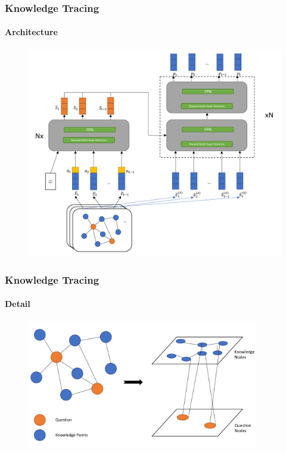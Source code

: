 \documentclass{beamer}
\begin{document}
\begin{frame}
  \frametitle{Knowledge Tracing}
  \framesubtitle{Architecture}
  \begin{figure}
    \includegraphics[height=0.8\textheight]{figures/ch3-overview.pdf}
  \end{figure}
\end{frame}

\begin{frame}
  \frametitle{Knowledge Tracing}
  \framesubtitle{Detail}
  \begin{figure}
    \includegraphics[width=0.9\textwidth]{figures/ch3-gat-kq.pdf}
  \end{figure}
\end{frame}


\end{document}
